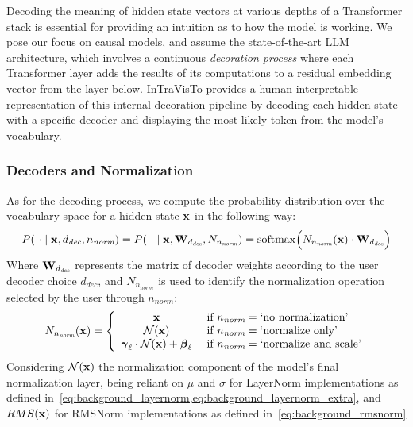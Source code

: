 Decoding the meaning of hidden state vectors at various depths of a Transformer stack is essential for providing an intuition as to how the model is working.
We pose our focus on causal models, and assume the state-of-the-art LLM architecture, which involves a continuous \emph{decoration process} where each Transformer layer adds the results of its computations to a residual embedding vector from the layer below.
InTraVisTo provides a human-interpretable representation of this internal decoration pipeline by decoding each hidden state with a specific decoder and displaying the most likely token from the model's vocabulary.

\subsubsection{Decoders and Normalization}\label{sssec:method_intravisto_decoding_norm}

As for the decoding process, we compute the probability distribution over the vocabulary space for a hidden state $\bm{\mathbf{x}}$ in the following way:
\begin{equation}
    \label{eq:method_intravisto_decoding}
    P(\ \cdot \mid \bm{\mathbf{x}}, d_\textit{dec}, n_\textit{norm}) = P(\ \cdot \mid \bm{\mathbf{x}}, \bm{\mathbf{W}}_{d_\textit{dec}}, N_{n_\textit{norm}}) = \operatorname{softmax}\Bigl(N_{n_\textit{norm}}(\bm{\mathbf{x}}) \cdot \bm{\mathbf{W}}_{d_\textit{dec}}\Bigr)
\end{equation}
Where $\bm{\mathbf{W}}_{d_\textit{dec}}$ represents the matrix of decoder weights according to the user decoder choice $d_\textit{dec}$, and $N_{n_\textit{norm}}$ is used to identify the normalization operation selected by the user through $n_\textit{norm}$:
\begin{equation}
    N_{n_\textit{norm}}(\bm{\mathbf{x}}) = 
    \label{eq:method_intravisto_normalization}
    \left\{
    \begin{array}{cl}
        \bm{\mathbf{x}} &\ \text{if}\ n_\textit{norm} = \text{`no normalization'} \\
        \mathcal{N}{(\bm{\mathbf{x}})} &\ \text{if}\ n_\textit{norm} = \text{`normalize only'} \\
        \bm{\mathbf{\gamma}}_\ell \cdot \mathcal{N}{(\bm{\mathbf{x}})} + \bm{\mathbf{\beta}}_\ell &\ \text{if}\ n_\textit{norm} = \text{`normalize and scale'}
    \end{array}
    \right.
\end{equation}
Considering $\mathcal{N}{(\bm{\mathbf{x}})}$ the normalization component of the model's final normalization layer, being reliant on $\mu$ and $\sigma$ for LayerNorm implementations as defined in~\cref{eq:background_layernorm,eq:background_layernorm_extra}, and $RMS(\bm{\mathbf{x}})$ for RMSNorm implementations as defined in~\cref{eq:background_rmsnorm}

